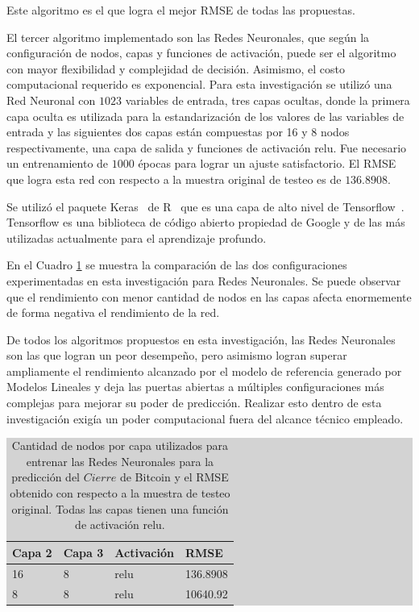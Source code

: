 \documentclass[a4paper,12pt,twocolumn]{article}
\begin{document}
Este algoritmo es el que logra el mejor RMSE de todas las propuestas.

El tercer algoritmo implementado son las Redes Neuronales, que según la configuración de nodos, capas y funciones de activación, puede ser el algoritmo con mayor flexibilidad y complejidad de decisión. Asimismo, el costo computacional requerido es exponencial. Para esta investigación se utilizó una Red Neuronal con $1023$ variables de entrada, tres capas ocultas, donde la primera capa oculta es utilizada para la estandarización de los valores de las variables de entrada y las siguientes dos capas están compuestas por 16 y 8 nodos respectivamente, una capa de salida y funciones de activación relu. Fue necesario un entrenamiento de $1000$ épocas para lograr un ajuste satisfactorio. El RMSE que logra esta red con respecto a la muestra original de testeo es de $136.8908$. 

Se utilizó el paquete Keras~\cite{keras} de R~\cite{r} que es una capa de alto nivel de Tensorflow~\cite{tensorflow}. Tensorflow es una biblioteca de código abierto propiedad de Google y de las más utilizadas actualmente para el aprendizaje profundo.

En el Cuadro \ref{redesModelTuning} se muestra la comparación de las dos configuraciones experimentadas en esta investigación para Redes Neuronales. Se puede observar que el rendimiento con menor cantidad de nodos en las capas afecta enormemente de forma negativa el rendimiento de la red.

De todos los algoritmos propuestos en esta investigación, las Redes Neuronales son las que logran un peor desempeño, pero asimismo logran superar ampliamente el rendimiento alcanzado por el modelo de referencia generado por Modelos Lineales y deja las puertas abiertas a múltiples configuraciones más complejas para mejorar su poder de predicción. Realizar esto dentro de esta investigación exigía un poder computacional fuera del alcance técnico empleado. 

\begin{table}[!hbt]
\centering
\caption{Cantidad de nodos por capa utilizados para entrenar las Redes Neuronales para la predicción del $Cierre$ de Bitcoin y el RMSE obtenido con respecto a la muestra de testeo original. Todas las capas tienen una función de activación relu.}
\label{redesModelTuning}
\begingroup\setlength{\fboxsep}{0pt}
\colorbox{lightgray}{%
\begin{tabular}{|l|l|l|l|}
\hline Capa 2 &  Capa 3  &  Activación & RMSE \\
\hline 16 & 8  &  relu &136.8908\\
\hline 8 & 8  &  relu &10640.92\\
\hline
\end{tabular}%
}\endgroup
\end{table}
\end{document}
